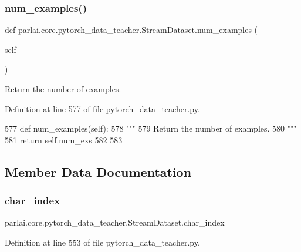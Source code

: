 \subsubsection{\texorpdfstring{num\+\_\+examples()}{num\_examples()}}
{\footnotesize\ttfamily def parlai.\+core.\+pytorch\+\_\+data\+\_\+teacher.\+Stream\+Dataset.\+num\+\_\+examples (\begin{DoxyParamCaption}\item[{}]{self }\end{DoxyParamCaption})}

\begin{DoxyVerb}Return the number of examples.
\end{DoxyVerb}
 

Definition at line 577 of file pytorch\+\_\+data\+\_\+teacher.\+py.


\begin{DoxyCode}
577     \textcolor{keyword}{def }num\_examples(self):
578         \textcolor{stringliteral}{"""}
579 \textcolor{stringliteral}{        Return the number of examples.}
580 \textcolor{stringliteral}{        """}
581         \textcolor{keywordflow}{return} self.num\_exs
582 
583 
\end{DoxyCode}


\subsection{Member Data Documentation}
\mbox{\label{classparlai_1_1core_1_1pytorch__data__teacher_1_1StreamDataset_a632ed3ae104c8cee00730e9f1f827cc4}} 
\subsubsection{\texorpdfstring{char\+\_\+index}{char\_index}}
{\footnotesize\ttfamily parlai.\+core.\+pytorch\+\_\+data\+\_\+teacher.\+Stream\+Dataset.\+char\+\_\+index}



Definition at line 553 of file pytorch\+\_\+data\+\_\+teacher.\+py.

